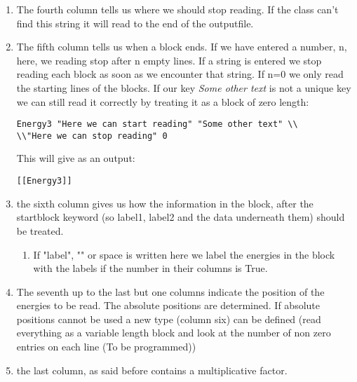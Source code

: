 \documentclass[a4paper, fleqn]{article}
\begin{document}
\begin{enumerate}
\begin{verbatim}
Here we can stop reading
\end{verbatim}
Now if we add to the datafile the following line:
\begin{verbatim}
"Energy 1 and 2" "Some text" "" 4
\end{verbatim}
Now if we have the following program to read the outputfile
\begin{verbatim}
p=diracparser()
p.keys=['Energy 1 and 2']
p.files=['outputfile']
print p.files, p.energy
\end{verbatim}
We obtain the result:
\begin{verbatim}
['outputfile'] [[4*energy1, 4*energy2]] 
\end{verbatim}
So the last number on an inputline gives us a correctionfactor to get the numbers to different units or something like that. 
\item The fourth column tells us where we should stop reading. If the class can't find this string it will read to the end of the outputfile.
\item The fifth column tells us when a block ends. If we have entered a number, n, here, we reading stop after n empty lines. If a string is entered we stop reading each block as soon as we encounter that string. If n=0 we only read the starting lines of the blocks. If our key \textit{Some other text} is not a unique key we can still read it correctly by treating it as a block of zero length:
\begin{verbatim}
Energy3 "Here we can start reading" "Some other text" \\
\\"Here we can stop reading" 0
\end{verbatim}
This will give as an output:
\begin{verbatim}
[[Energy3]]
\end{verbatim}
\item the sixth column gives us how the information in the block, after the startblock keyword (so label1, label2 and the data underneath them) should be treated. 
\begin{enumerate}
\item If "label", "" or space is written here we label the energies in the block with the labels if the number in their columns is True. 
\end{enumerate}
\item The seventh up to the last but one columns indicate the position of the energies to be read. The absolute positions are determined. If absolute positions cannot be used a new type (column six) can be defined (read everything as a variable length block and look at the number of non zero entries on each line (To be programmed))
\item the last column, as said before contains a multiplicative factor.
\end{enumerate}
\end{document}
